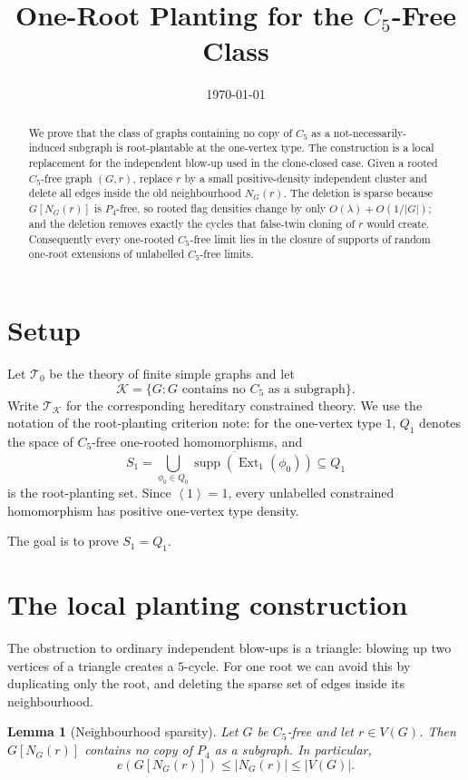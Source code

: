 \documentclass[11pt]{article}
\title{One-Root Planting for the \texorpdfstring{$C_5$}{C5}-Free Class}
\author{}
\date{\today}
\newtheorem{lemma}[theorem]{Lemma}
\theoremstyle{definition}
\newcommand{\K}{\mathcal K}
\newcommand{\T}{\mathcal T}
\newcommand{\Ext}{\operatorname{Ext}}
\newcommand{\supp}{\operatorname{supp}}
\newcommand{\brak}[1]{\left\langle #1\right\rangle}
\begin{document}
\maketitle

\begin{abstract}
We prove that the class of graphs containing no copy of $C_5$ as a
not-necessarily-induced subgraph is root-plantable at the one-vertex type.
The construction is a local replacement for the independent blow-up used in the
clone-closed case.  Given a rooted $C_5$-free graph $(G,r)$, replace $r$ by a
small positive-density independent cluster and delete all edges inside the old
neighbourhood $N_G(r)$.  The deletion is sparse because $G[N_G(r)]$ is
$P_4$-free, so rooted flag densities change by only $O(\lambda)+O(1/|G|)$; and
the deletion removes exactly the cycles that false-twin cloning of $r$ would
create.  Consequently every one-rooted $C_5$-free limit lies in the closure of
supports of random one-root extensions of unlabelled $C_5$-free limits.
\end{abstract}

\section{Setup}

Let $\T_0$ be the theory of finite simple graphs and let
\[
  \K=\{G:\text{$G$ contains no $C_5$ as a subgraph}\}.
\]
Write $\T_\K$ for the corresponding hereditary constrained theory.  We use the
notation of the root-planting criterion note: for the one-vertex type
$1$, $Q_1$ denotes the space of $C_5$-free one-rooted homomorphisms, and
\[
  S_1=
  \overline{
  \bigcup_{\phi_0\in Q_0}
  \supp(\Ext_1(\phi_0))}
  \subseteq Q_1
\]
is the root-planting set.  Since $\brak{1}=1$, every unlabelled constrained
homomorphism has positive one-vertex type density.

The goal is to prove $S_1=Q_1$.

\section{The local planting construction}

The obstruction to ordinary independent blow-ups is a triangle: blowing up two
vertices of a triangle creates a $5$-cycle.  For one root we can avoid this by
duplicating only the root, and deleting the sparse set of edges inside its
neighbourhood.

\begin{lemma}[Neighbourhood sparsity]\label{lem:nbhd-sparse}
Let $G$ be $C_5$-free and let $r\in V(G)$.  Then $G[N_G(r)]$ contains no copy
of $P_4$ as a subgraph.  In particular,
\[
  e(G[N_G(r)])\le |N_G(r)|\le |V(G)|.
\]
\end{lemma}
\end{document}
